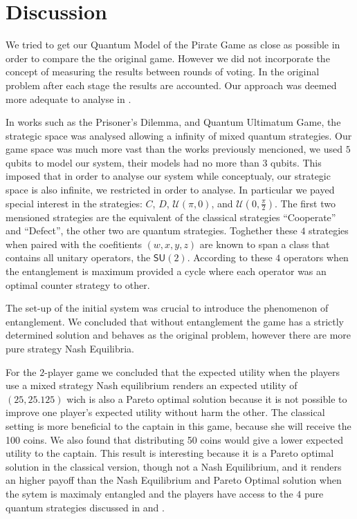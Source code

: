 \clearpage
\section{Discussion}
\label{subsec:3playergame:discution}



We tried to get our Quantum Model of the Pirate Game as close as possible in order to compare the the original game. However we did not incorporate the concept of measuring the results between rounds of voting. In the original problem after each stage the results are accounted. Our approach was deemed more adequate to analyse in \cite{Fra2011}.

In works such as the Prisoner's Dilemma\cite{Letters2002}\cite{Eisert2008}, and Quantum Ultimatum Game\cite{Fra2011}, the strategic space was analysed allowing a infinity of mixed quantum strategies. Our game space was much more vast than the works previously mencioned, we used $5$ qubits to model our system, their models had no more than $3$ qubits. This imposed that in order to analyse our system while conceptualy, our strategic space is also infinite, we restricted in order to analyse. In particular we payed special interest in the strategies: $C$, $D$, $\mathcal{U}(\pi, 0)$, and $\mathcal{U}(0, \frac{\pi}{2})$. The first two mensioned strategies are the equivalent of the classical strategies ``Cooperate'' and ``Defect'', the other two are quantum strategies. Toghether these $4$ strategies when paired with the coefitients $(w,x,y,z)$ are known to span a class that contains all unitary operators, the $\mathsf{SU}(2)$. According to \cite{Du} these $4$ operators when the entanglement is maximum provided a cycle where each operator was an optimal counter strategy to other. 

The set-up of the initial system was crucial to introduce the phenomenon of entanglement. We concluded that without entanglement the game has a strictly determined solution and behaves as the original problem, however there are more pure strategy Nash Equilibria.

For the $2$-player game we concluded that the expected utility when the players use a mixed strategy Nash equilibrium renders an expected utility of $(25, 25.125)$ wich is also a Pareto optimal solution because it is not possible to improve one player's expected utility without harm the other. The classical setting is more beneficial to the captain in this game, because she will receive the 100 coins. We also found that distributing 50 coins would give a lower expected utility to the captain. This result is interesting because it is a Pareto optimal solution in the classical version, though not a Nash Equilibrium, and it renders an higher payoff than the Nash Equilibrium and Pareto Optimal solution when the sytem is maximaly entangled and the players have access to the $4$ pure quantum strategies discussed in \cite{Du} and \cite{Letters2002}. 

